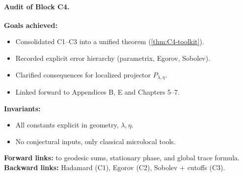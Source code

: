 \paragraph{Audit of Block C4.}
\begin{auditblock}[C4]
\textbf{Goals achieved:}
\begin{itemize}
  \item Consolidated C1–C3 into a unified theorem (\ref{thm:C4-toolkit}).
  \item Recorded explicit error hierarchy (parametrix, Egorov, Sobolev).
  \item Clarified consequences for localized projector $P_{\lambda,\eta}$.
  \item Linked forward to Appendices B, E and Chapters 5–7.
\end{itemize}
\textbf{Invariants:}
\begin{itemize}
  \item All constants explicit in geometry, $\lambda,\eta$.
  \item No conjectural inputs, only classical microlocal tools.
\end{itemize}
\textbf{Forward links:} to geodesic sums, stationary phase, and global trace formula.  
\textbf{Backward links:} Hadamard (C1), Egorov (C2), Sobolev + cutoffs (C3).
\end{auditblock}
